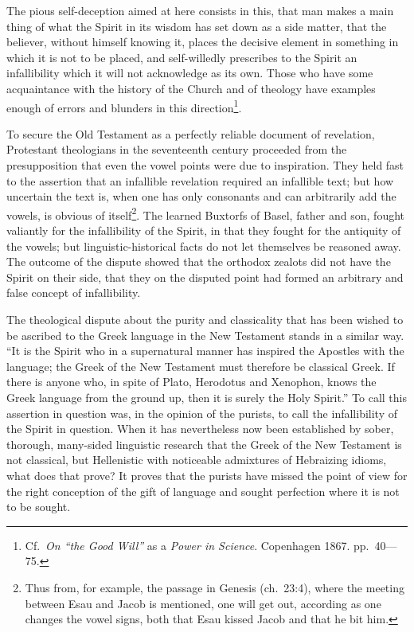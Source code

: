 \documentclass[12pt,a4paper,openany]{book}
\newcommand{\opage}[1]{\marginnote{\footnotesize\textit{[#1]}}}
\begin{document}
The pious self-deception aimed at here consists
in this, that man makes a main thing of what the Spirit in
its wisdom has set down as a side matter, that the believer, without
himself knowing it, places the decisive element in something in which
it is not to be placed, and self-willedly prescribes to the Spirit
an infallibility which it will not acknowledge as its own. Those
who have some acquaintance with the history of the Church and of theology
\setcounter{footnote}{0}%
\opage{314}have examples enough of errors and blunders
in this direction\footnote[1]{Cf.\ \emph{On ``the Good Will''} as a \emph{Power in Science}. Copenhagen 1867. pp.\ 40---75.}.

To secure the Old Testament as a perfectly
reliable document of revelation, Protestant
theologians in the seventeenth century proceeded from the
presupposition that even the vowel points were due to inspiration.
They held fast to the assertion that an infallible
revelation required an infallible text; but how uncertain
the text is, when one has only consonants and can arbitrarily
add the vowels, is obvious of itself\footnote[2]{Thus from, for example, the passage in Genesis (ch.\ 23:4), where the meeting between Esau and Jacob is mentioned, one will get out, according as one changes the vowel signs, both that Esau kissed Jacob and that he bit him.}. The
learned Buxtorfs of Basel, father and son, fought valiantly
for the infallibility of the Spirit, in that they fought for the antiquity
of the vowels; but linguistic-historical facts do not let themselves
be reasoned away. The outcome of the dispute showed that the orthodox
zealots did not have the Spirit on their side, that they
on the disputed point had formed an arbitrary
and false concept of infallibility.

The theological dispute about the purity and classicality that has
been wished to be ascribed to the Greek language in the New Testament
stands in a similar way. ``It is the Spirit who in a supernatural manner
has inspired the Apostles with the language; the Greek of the New Testament
must therefore be classical Greek. If there is anyone
who, in spite of Plato, Herodotus and Xenophon, knows the Greek
language from the ground up, then it is surely the Holy Spirit.''
\setcounter{footnote}{0}%
\opage{315}To call this assertion in question was, in the opinion of the purists,
to call the infallibility of the Spirit in question. When
it has nevertheless now been established by sober, thorough, many-sided linguistic research
that the Greek of the New
Testament is not classical, but Hellenistic with noticeable
admixtures of Hebraizing idioms, what
does that prove? It proves that the purists have missed
the point of view for the right conception of the gift of language and
sought perfection where it is not to be sought.
\end{document}
